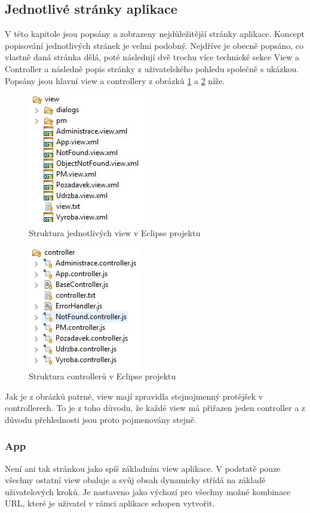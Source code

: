 \documentclass[thesis=M,czech]{FITthesis}[2012/06/26]
\begin{document}
\subsection{Jednotlivé stránky aplikace}
V této kapitole jsou popsány a zobrazeny nejdůležitější stránky aplikace. Koncept popisování jednotlivých stránek je velmi podobný. Nejdříve je obecně popsáno, co vlastně daná stránka dělá, poté následují dvě trochu více technické sekce View a Controller a následně popis stránky z uživatelského pohledu společně s ukázkou. Popsány jsou hlavní view a controllery z obrázků \ref{img:views_strucutre} a \ref{img:controlllers_structure} níže.
\begin{figure}[H]
	\centering
	\includegraphics[]{images/fiori_app_view_struct}
	\caption{Struktura jednotlivých view v Eclipse projektu}
	\label{img:views_strucutre}
\end{figure}
\begin{figure}[H]
	\centering
	\includegraphics[]{images/fiori_app_controller_struct}
	\caption{Struktura controllerů v Eclipse projektu}
	\label{img:controlllers_structure}
\end{figure}
Jak je z obrázků patrné, view mají zpravidla stejnojmenný protějšek v controllerech. To je z toho důvodu, že každé view má přiřazen jeden controller a z důvodu přehlednosti jsou proto pojmenovány stejně. 

\subsubsection{App}
\label{sssec:fiori_app}
Není ani tak stránkou jako spíš základním view aplikace. V podstatě pouze všechny ostatní view obaluje a svůj obsah dynamicky střídá na základě uživatelových kroků. Je nastaveno jako výchozí pro všechny možné kombinace URL, které je uživatel v rámci aplikace schopen vytvořit.
\end{document}
